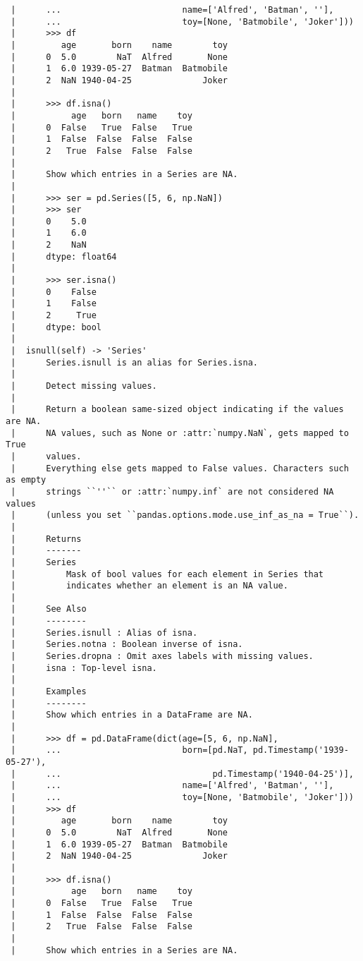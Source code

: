 \documentclass[
  letterpaper,
  DIV=11,
  numbers=noendperiod]{scrreprt}
\begin{document}
\begin{verbatim}
 |      ...                        name=['Alfred', 'Batman', ''],
 |      ...                        toy=[None, 'Batmobile', 'Joker']))
 |      >>> df
 |         age       born    name        toy
 |      0  5.0        NaT  Alfred       None
 |      1  6.0 1939-05-27  Batman  Batmobile
 |      2  NaN 1940-04-25              Joker
 |      
 |      >>> df.isna()
 |           age   born   name    toy
 |      0  False   True  False   True
 |      1  False  False  False  False
 |      2   True  False  False  False
 |      
 |      Show which entries in a Series are NA.
 |      
 |      >>> ser = pd.Series([5, 6, np.NaN])
 |      >>> ser
 |      0    5.0
 |      1    6.0
 |      2    NaN
 |      dtype: float64
 |      
 |      >>> ser.isna()
 |      0    False
 |      1    False
 |      2     True
 |      dtype: bool
 |  
 |  isnull(self) -> 'Series'
 |      Series.isnull is an alias for Series.isna.
 |      
 |      Detect missing values.
 |      
 |      Return a boolean same-sized object indicating if the values are NA.
 |      NA values, such as None or :attr:`numpy.NaN`, gets mapped to True
 |      values.
 |      Everything else gets mapped to False values. Characters such as empty
 |      strings ``''`` or :attr:`numpy.inf` are not considered NA values
 |      (unless you set ``pandas.options.mode.use_inf_as_na = True``).
 |      
 |      Returns
 |      -------
 |      Series
 |          Mask of bool values for each element in Series that
 |          indicates whether an element is an NA value.
 |      
 |      See Also
 |      --------
 |      Series.isnull : Alias of isna.
 |      Series.notna : Boolean inverse of isna.
 |      Series.dropna : Omit axes labels with missing values.
 |      isna : Top-level isna.
 |      
 |      Examples
 |      --------
 |      Show which entries in a DataFrame are NA.
 |      
 |      >>> df = pd.DataFrame(dict(age=[5, 6, np.NaN],
 |      ...                        born=[pd.NaT, pd.Timestamp('1939-05-27'),
 |      ...                              pd.Timestamp('1940-04-25')],
 |      ...                        name=['Alfred', 'Batman', ''],
 |      ...                        toy=[None, 'Batmobile', 'Joker']))
 |      >>> df
 |         age       born    name        toy
 |      0  5.0        NaT  Alfred       None
 |      1  6.0 1939-05-27  Batman  Batmobile
 |      2  NaN 1940-04-25              Joker
 |      
 |      >>> df.isna()
 |           age   born   name    toy
 |      0  False   True  False   True
 |      1  False  False  False  False
 |      2   True  False  False  False
 |      
 |      Show which entries in a Series are NA.

\end{verbatim}
\end{document}
